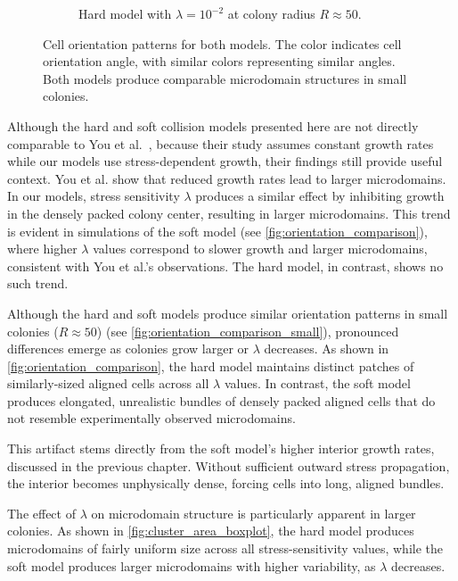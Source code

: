 \documentclass[conference]{IEEEtran}
\begin{document}
\begin{figure}[h]
\begin{subfigure}[b]{0.49\columnwidth}
        \caption{Hard model with $\lambda = 10^{-2}$ at colony radius $R \approx 50$.}
    \end{subfigure}
    \caption{Cell orientation patterns for both models. The color indicates cell orientation angle, with similar colors representing similar angles. Both models produce comparable microdomain structures in small colonies.}
    \label{fig:orientation_comparison_small}
\end{figure}

Although the hard and soft collision models presented here are not directly comparable to You et al.~\cite{You2018}, because their study assumes constant growth rates while our models use stress-dependent growth, their findings still provide useful context. You et al. show that reduced growth rates lead to larger microdomains. In our models, stress sensitivity $\lambda$ produces a similar effect by inhibiting growth in the densely packed colony center, resulting in larger microdomains. This trend is evident in simulations of the soft model (see \autoref{fig:orientation_comparison}), where higher $\lambda$ values correspond to slower growth and larger microdomains, consistent with You et al.'s observations. The hard model, in contrast, shows no such trend.

Although the hard and soft models produce similar orientation patterns in small colonies ($R \approx 50$) (see \autoref{fig:orientation_comparison_small}), pronounced differences emerge as colonies grow larger or $\lambda$ decreases. As shown in \autoref{fig:orientation_comparison}, the hard model maintains distinct patches of similarly-sized aligned cells across all $\lambda$ values. In contrast, the soft model produces elongated, unrealistic bundles of densely packed aligned cells that do not resemble experimentally observed microdomains.

This artifact stems directly from the soft model's higher interior growth rates, discussed in the previous chapter. Without sufficient outward stress propagation, the interior becomes unphysically dense, forcing cells into long, aligned bundles.

The effect of $\lambda$ on microdomain structure is particularly apparent in larger colonies. As shown in \autoref{fig:cluster_area_boxplot}, the hard model produces microdomains of fairly uniform size across all stress-sensitivity values, while the soft model produces larger microdomains with higher variability, as $\lambda$ decreases.
\end{document}
